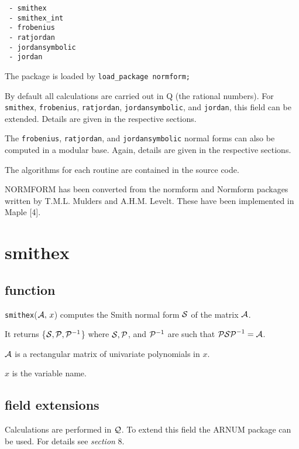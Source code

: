 \begin{itemize}
\begin{verbatim}
 - smithex
 - smithex_int
 - frobenius
 - ratjordan
 - jordansymbolic
 - jordan
\end{verbatim}
\end{itemize}

The package is loaded by {\tt load\_package normform;}

By default all calculations are carried out in {\cal Q} (the rational
numbers). For {\tt smithex}, {\tt frobenius}, {\tt ratjordan},
{\tt jordansymbolic}, and {\tt jordan}, this field can be extended.
Details are given in the respective sections.

The {\tt frobenius}, {\tt ratjordan}, and {\tt jordansymbolic} normal
forms can also be computed in a modular base. Again, details are given
in the respective sections.

The algorithms for each routine are contained in the source code.

{\small NORMFORM} has been converted from the normform and Normform
packages written by T.M.L. Mulders and A.H.M. Levelt. These have been
implemented in Maple [4].


\section{smithex}

\subsection{function}

{\tt smithex}(${\cal A},\, x$) computes the Smith normal form ${\cal S}$
of the matrix ${\cal A}$.

It returns \{${\cal S}, {\cal P}, {\cal P}^{-1}$\} where ${\cal S},
{\cal P}$, and ${\cal P}^{-1}$ are such that ${\cal P S P}^{-1} =
{\cal A}$.

${\cal A}$ is a rectangular matrix of univariate polynomials in $x$.

$x$ is the variable name.

\subsection{field extensions}

Calculations are performed in ${\cal Q}$. To extend this field the
{\small ARNUM} package can be used. For details see {\it section} 8.

